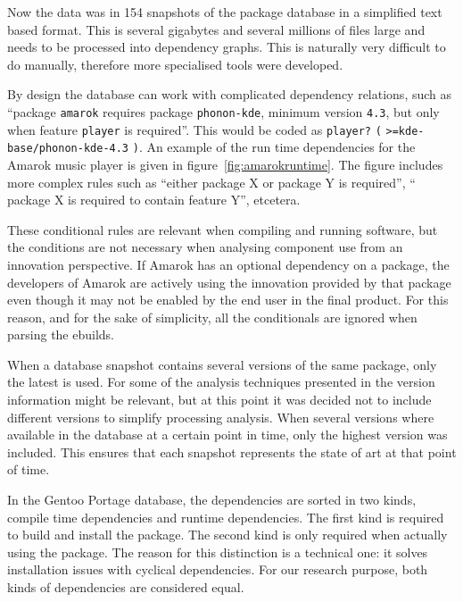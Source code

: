 \documentclass[smallextended,final]{svjour3}
\begin{document}
Now the data was in 154 snapshots of the package database in a simplified text based format. This is several gigabytes and several millions of files large and needs to be processed into dependency graphs. This is naturally very difficult to do manually, therefore more specialised tools were developed.

By design the database can work with complicated dependency relations, such as ``package \verb|amarok| requires package \verb|phonon-kde|, minimum version \verb|4.3|, but only when feature \verb|player| is required''. This would be coded as \verb|player?| \verb|(| \verb|>=kde-base/phonon-kde-4.3| \verb|)|. An example of the run time dependencies for the Amarok music player is given in figure~\ref{fig:amarokruntime}. The figure includes more complex rules such as ``either package X or package Y is required'', `` package X is required to contain feature Y'', etcetera.

These conditional rules are relevant when compiling and running software, but the conditions are not necessary when analysing component use from an innovation perspective. If Amarok has an optional dependency on a package, the developers of Amarok are actively using the innovation provided by that package even though it may not be enabled by the end user in the final product. For this reason, and for the sake of simplicity, all the conditionals are ignored when parsing the ebuilds.

When a database snapshot contains several versions of the same package, only the latest is used. For some of the analysis techniques presented in the version information might be relevant, but at this point it was decided not to include different versions to simplify processing analysis. When several versions where available in the database at a certain point in time, only the highest version was included. This ensures that each snapshot represents the state of art at that point of time.

In the Gentoo Portage database, the dependencies are sorted in two kinds, compile time dependencies and runtime dependencies. The first kind is required to build and install the package. The second kind is only required when actually using the package. The reason for this distinction is a technical one: it solves installation issues with cyclical dependencies. For our research purpose, both kinds of dependencies are considered equal.
\end{document}
